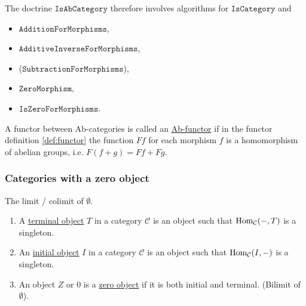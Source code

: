 \begin{doctrine}[Ab-category]\label{doc:ab-category}
The doctrine $\mathtt{IsAbCategory}$ therefore involves algorithms for $\mathtt{IsCategory}$ and
\begin{itemize}
\item $\mathtt{AdditionForMorphisms}$,
\item $\mathtt{AdditiveInverseForMorphisms}$,
\item ($\mathtt{SubtractionForMorphisms}$),
\item $\mathtt{ZeroMorphism}$,
\item $\mathtt{IsZeroForMorphisms}$.
\end{itemize}
\end{doctrine}

\begin{definition}[Ab-functor]
A functor between Ab-categories is called an \ul{Ab-functor} if in the functor definition \ref{def:functor} the function $Ff$ for each
morphism $f$ is a homomorphism of abelian groups, i.e. $F(f+g) = Ff + Fg$.
\end{definition}

\subsubsection{Categories with a zero object}

\begin{remark}\label{def:init_term_zero_object}
The limit / colimit of $\emptyset$.
\renewcommand{\labelenumi}{(\theenumi)}
\begin{enumerate}
\item A \ul{terminal object} $T$ in a category $\mathcal{C}$ is an object such that $\textup{Hom}_{\mathcal{C}}(-,T)$ is a singleton.
\item An \ul{initial object} $I$ in a category $\mathcal{C}$ is an object such that $\textup{Hom}_{\mathcal{C}}(I,-)$ is a singleton.
\item An object $Z$ or $0$ is a \ul{zero object} if it is both initial and terminal. (Bilimit of $\emptyset$).
\end{enumerate}
\end{remark}


